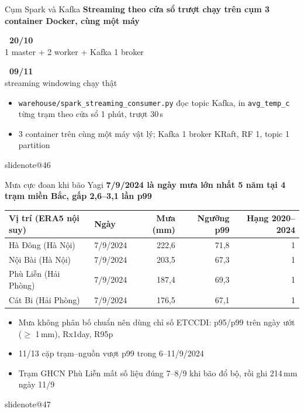 \documentclass[t,aspectratio=169,12pt]{beamer}
\makeatletter
\newcommand{\slidenote}[1]{\ifcsname slidenote@#1\endcsname\note{\csname slidenote@#1\endcsname}\fi}
\newcommand{\ychinh}[1]{\vskip1mm{\bfseries #1}\par\vskip1mm}
\newcommand{\bignumS}[4]{%
  \begin{minipage}[t]{#4}\centering
    {\fontsize{22}{26}\selectfont\bfseries\color{#3}#1}\\[1pt]
    {\footnotesize #2}\end{minipage}}
\makeatother
\begin{document}
\begin{frame}{Cụm Spark và Kafka}
  \ychinh{Streaming theo cửa sổ trượt chạy trên cụm 3 container Docker, cùng một máy}
  \begin{center}
    \bignumS{\checkmark\ 20/10}{1 master + 2 worker + Kafka 1 broker}{goodgreen}{5.2cm}
    \bignumS{\checkmark\ 09/11}{streaming windowing chạy thật}{goodgreen}{5.2cm}
  \end{center}
  \begin{itemize}\small\setlength\itemsep{1.5mm}
    \item \texttt{warehouse/spark\_streaming\_consumer.py} đọc topic Kafka, in \texttt{avg\_temp\_c} từng trạm theo cửa sổ 1 phút, trượt 30\,s
    \item 3 container trên cùng một máy vật lý; Kafka 1 broker KRaft, RF 1, topic 1 partition
  \end{itemize}
  \slidenote{46}
\end{frame}
\begin{frame}{Mưa cực đoan khi bão Yagi}
  \ychinh{7/9/2024 là ngày mưa lớn nhất 5 năm tại 4 trạm miền Bắc, gấp 2,6--3,1 lần p99}
  \centering\small
  \begin{tabular}{@{}llrrr@{}}
    \toprule
    Vị trí (ERA5 nội suy) & Ngày & Mưa (mm) & Ngưỡng p99 & Hạng 2020--2024 \\
    \midrule
    Hà Đông (Hà Nội) & 7/9/2024 & 222,6 & 71,8 & 1 \\
    Nội Bài (Hà Nội) & 7/9/2024 & 203,5 & 67,3 & 1 \\
    Phù Liễn (Hải Phòng) & 7/9/2024 & 187,4 & 69,3 & 1 \\
    Cát Bi (Hải Phòng) & 7/9/2024 & 176,5 & 67,1 & 1 \\
    \bottomrule
  \end{tabular}
  \raggedright
  \begin{itemize}\footnotesize\setlength\itemsep{0.5mm}
    \item Mưa không phân bố chuẩn nên dùng chỉ số ETCCDI: p95/p99 trên ngày ướt ($\ge$ 1\,mm), Rx1day, R95p
    \item 11/13 cặp trạm--nguồn vượt p99 trong 6--11/9/2024
    \item Trạm GHCN Phù Liễn mất số liệu đúng 7--8/9 khi bão đổ bộ, rồi ghi 214\,mm ngày 11/9
  \end{itemize}
  \slidenote{47}
\end{frame}
\end{document}
